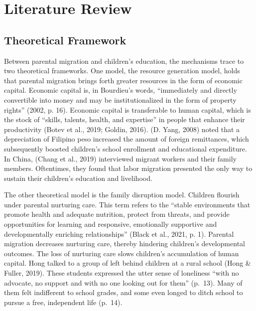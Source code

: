 \documentclass[
  man,floatsintext]{apa7}
\begin{document}
\newpage

\hypertarget{literature-review}{%
\section{Literature Review}\label{literature-review}}

\hypertarget{theoretical-framework}{%
\subsection{Theoretical Framework}\label{theoretical-framework}}

Between parental migration and children's education, the mechanisms trace to two theoretical frameworks. One model, the resource generation model, holds that parental migration brings forth greater resources in the form of economic capital. Economic capital is, in Bourdieu's words, ``immediately and directly convertible into money and may be institutionalized in the form of property rights'' (2002, p. 16). Economic capital is transferable to human capital, which is the stock of ``skills, talents, health, and expertise'' in people that enhance their productivity (Botev et al., 2019; Goldin, 2016). (D. Yang, 2008) noted that a depreciation of Filipino peso increased the amount of foreign remittances, which subsequently boosted children's school enrollment and educational expenditure. In China, (Chang et al., 2019) interviewed migrant workers and their family members. Oftentimes, they found that labor migration presented the only way to sustain their children's education and livelihood.

The other theoretical model is the family disruption model. Children flourish under parental nurturing care. This term refers to the ``stable environments that promote health and adequate nutrition, protect from threats, and provide opportunities for learning and responsive, emotionally supportive and developmentally enriching relationships'' (Black et al., 2021, p. 1). Parental migration decreases nurturing care, thereby hindering children's developmental outcomes. The loss of nurturing care slows children's accumulation of human capital. Hong talked to a group of left behind children at a rural school (Hong \& Fuller, 2019). These students expressed the utter sense of loneliness ``with no advocate, no support and with no one looking out for them'' (p.~13). Many of them felt indifferent to school grades, and some even longed to ditch school to pursue a free, independent life (p.~14).
\end{document}
